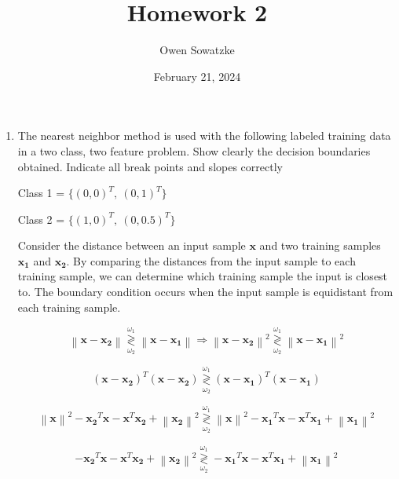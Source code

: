 \documentclass[fleqn]{article}
\title{Homework 2}
\author{Owen Sowatzke}
\date{February 21, 2024}
\newcommand{\zerodisplayskip}{
	\setlength{\abovedisplayskip}{0pt}%
	\setlength{\belowdisplayskip}{0pt}%
	\setlength{\abovedisplayshortskip}{0pt}%
	\setlength{\belowdisplayshortskip}{0pt}%
	\setlength{\mathindent}{0pt}}
\newcommand{\norm}[1]{\left \lVert #1 \right \rVert}
\begin{document}
	\offinterlineskip
	\setlength{\lineskip}{12pt}
	\zerodisplayskip
	\maketitle
	
	\begin{enumerate}
		\item  The nearest neighbor method is used with the following labeled training data in a two class, two feature problem. Show clearly the decision boundaries obtained. Indicate all break points and slopes correctly
		
		Class 1 = $\{(0,0)^T,\:(0,1)^T\}$
		
		Class 2 = $\{(1,0)^T,\:(0,0.5)^T\}$
		
		Consider the distance between an input sample $\mathbf{x}$ and two training samples $\mathbf{x_1}$ and $\mathbf{x_2}$. By comparing the distances from the input sample to each training sample, we can determine which training sample the input is closest to. The boundary condition occurs when the input sample is equidistant from each training sample. 
		
		\begin{equation*}
			\norm{\mathbf{x} - \mathbf{x_2}} \overset{\omega_1}{\underset{\omega_2}{\gtrless}} \norm{\mathbf{x} - \mathbf{x_1}} \Rightarrow \norm{\mathbf{x} - \mathbf{x_2}}^2  \overset{\omega_1}{\underset{\omega_2}{\gtrless}} \norm{\mathbf{x} - \mathbf{x_1}}^2
		\end{equation*}
		
		\begin{equation*}
			(\mathbf{x} - \mathbf{x_2})^T(\mathbf{x} - \mathbf{x_2}) \overset{\omega_1}{\underset{\omega_2}{\gtrless}} (\mathbf{x} - \mathbf{x_1})^T(\mathbf{x} - \mathbf{x_1})
		\end{equation*}
		
		\begin{equation*}
			\norm{\mathbf{x}}^2 - \mathbf{x_2}^T\mathbf{x} - \mathbf{x}^T\mathbf{x_2} + \norm{\mathbf{x_2}}^2 \overset{\omega_1}{\underset{\omega_2}{\gtrless}} \norm{\mathbf{x}}^2 - \mathbf{x_1}^T\mathbf{x} - \mathbf{x}^T\mathbf{x_1} + \norm{\mathbf{x_1}}^2
		\end{equation*}
		
		\begin{equation*}
			- \mathbf{x_2}^T\mathbf{x} - \mathbf{x}^T\mathbf{x_2} + \norm{\mathbf{x_2}}^2 \overset{\omega_1}{\underset{\omega_2}{\gtrless}} - \mathbf{x_1}^T\mathbf{x} - \mathbf{x}^T\mathbf{x_1} + \norm{\mathbf{x_1}}^2
		\end{equation*}
		

\end{enumerate}
\end{document}
